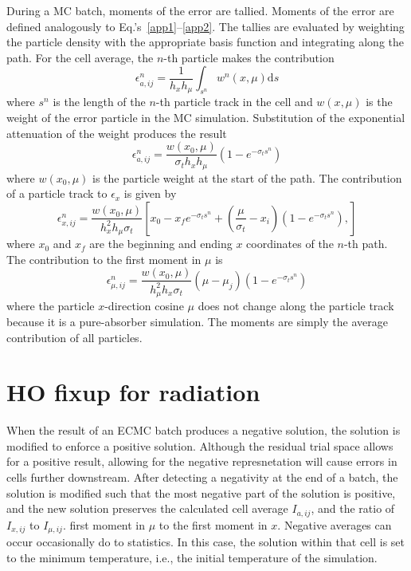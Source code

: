 \documentclass{mc2013}
\renewcommand{\d}{\mathrm{d}}
\begin{document}
During a MC batch, moments of the error are tallied.  Moments of the error are
defined analogously to Eq.'s~\eqref{app1}--\eqref{app2}.
The tallies are evaluated by weighting the particle density with the appropriate
basis function and integrating along the path.  For the cell average, the $n$-th
particle makes the contribution
\begin{equation}
    \epsilon^n_{a,ij} = \frac{1}{h_xh_\mu} \int_{s^n}  w^n(x,\mu) \d s
\end{equation}
where $s^n$ is the length of the $n$-th particle track in the cell and $w(x,\mu)$ is the weight of the error particle in the MC simulation.
Substitution of the exponential attenuation of the weight produces the result
\begin{equation}
    \epsilon^n_{a,ij} = \frac{w(x_0,\mu)}{\sigma_t h_x h_\mu} \left(1 - e^{-\sigma_ts^n}\right)
\end{equation}
where $w(x_0,\mu)$ is the particle weight at the start of the path. The contribution of a
particle track to $\epsilon_x$ is given by
\begin{equation}
    \epsilon^n_{x,ij} = \frac{w(x_0,\mu)}{h_x^2h_\mu \sigma_t} \left[x_0 - x_f e^{-\sigma_t s^n}
        + \left(\frac{\mu}{\sigma_t} - x_i \right)\left(1-e^{-\sigma_t s^n}\right),
    \right]
\end{equation}
where $x_0$ and $x_f$ are the beginning and ending $x$ coordinates of the $n$-th
path.  The contribution to the first moment in $\mu$ is 
\begin{equation}
    \epsilon^n_{\mu,ij} = \frac{w(x_0,\mu)}{h_{\mu}^2h_x\sigma_t}\left(\mu - \mu_j\right) \left(1 - e^{-\sigma_ts^n}\right)
\end{equation}
where the particle $x$-direction cosine $\mu$ does not change along the particle
track because it is a pure-absorber simulation.
The moments are simply the average contribution of all particles.

\section{HO fixup for radiation}

When the result of an ECMC batch produces a negative solution, the solution is
modified to enforce a positive solution.  Although the residual trial space allows
for a positive result, allowing for the negative represnetation will cause errors in
cells further downstream.  After detecting a negativity at the end of a batch, the
solution is modified such that the most negative part of the solution is positive,
and the new solution  preserves the calculated cell average $I_{a,ij}$, and the ratio of
$I_{x,ij}$ to $I_{\mu,ij}$. 
first moment in $\mu$ to the first moment in $x$.  Negative averages can occur
occasionally do to statistics.  In this case, the solution within that cell is set to
the minimum temperature, i.e., the initial temperature of the simulation.
\end{document}
